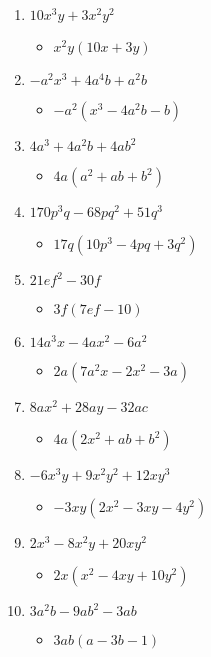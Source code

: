\documentclass{article}
\begin{document}
\begin{enumerate}
\item $10x^{3}y + 3x^{2}y^{2}$
  \begin{itemize}
  \item $x^{2}y(10x+3y)$
  \end{itemize}
\item $-a^{2}x^{3} + 4a^{4}b + a^{2}b$
  \begin{itemize}
  \item $-a^{2}(x^{3}-4a^{2}b-b)$
  \end{itemize}
\item $4a^{3} + 4a^{2}b + 4ab^{2}$
  \begin{itemize}
  \item $4a(a^{2}+ab+b^{2})$
  \end{itemize}
\item $170p^{3}q - 68pq^{2} + 51q^{3}$
  \begin{itemize}
  \item $17q(10p^{3}-4pq+3q^{2})$
  \end{itemize}
\item $21ef^{2} - 30f$
  \begin{itemize}
  \item $3f(7ef-10)$
  \end{itemize}
\item $14a^{3}x - 4ax^{2} - 6a^{2}$
  \begin{itemize}
  \item $2a(7a^{2}x-2x^{2}-3a)$
  \end{itemize}
\item $8ax^{2} + 28ay - 32ac$
  \begin{itemize}
  \item $4a(2x^{2}+ab+b^{2})$
  \end{itemize}
\item $-6x^{3}y + 9x^{2}y^{2} + 12xy^{3}$
  \begin{itemize}
  \item $-3xy(2x^{2}-3xy-4y^{2})$
  \end{itemize}
\item $2x^{3} - 8x^{2}y + 20xy^{2}$
  \begin{itemize}
  \item $2x(x^{2}-4xy+10y^{2})$
  \end{itemize}
\item $3a^{2}b - 9ab^{2} - 3ab$
  \begin{itemize}
  \item $3ab(a-3b-1)$

\end{itemize}
\end{enumerate}
\end{document}
